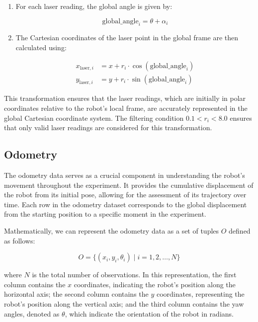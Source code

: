 \documentclass[conference]{IEEEtran}
\begin{document}
\begin{enumerate}
    \item For each laser reading, the global angle is given by:
    
    \begin{equation}
        \text{global\_angle}_i = \theta + \alpha_i
    \end{equation}

\item The Cartesian coordinates of the laser point in the global frame are then calculated using:

   \begin{align*}
   x_{\text{laser}, i} & = x + r_i \cdot \cos(\text{global\_angle}_i) \\
   y_{\text{laser}, i} & = y + r_i \cdot \sin(\text{global\_angle}_i)
   \end{align*}
\end{enumerate}

This transformation ensures that the laser readings, which are initially in polar coordinates relative to the robot's local frame, are accurately represented in the global Cartesian coordinate system. The filtering condition \( 0.1 < r_i < 8.0 \) ensures that only valid laser readings are considered for this transformation.

\subsection{Odometry} \label{sec:odometry}

The odometry data serves as a crucial component in understanding the robot's movement throughout the experiment. It provides the cumulative displacement of the robot from its initial pose, allowing for the assessment of its trajectory over time. Each row in the odometry dataset corresponds to the global displacement from the starting position to a specific moment in the experiment.

Mathematically, we can represent the odometry data as a set of tuples \( O \) defined as follows:

\[
O = \{(x_i, y_i, \theta_i) \mid i = 1, 2, \ldots, N\}
\]

where \( N \) is the total number of observations. In this representation, the first column contains the \( x \) coordinates, indicating the robot's position along the horizontal axis; the second column contains the \( y \) coordinates, representing the robot's position along the vertical axis; and the third column contains the yaw angles, denoted as \( \theta \), which indicate the orientation of the robot in radians.
\end{document}

